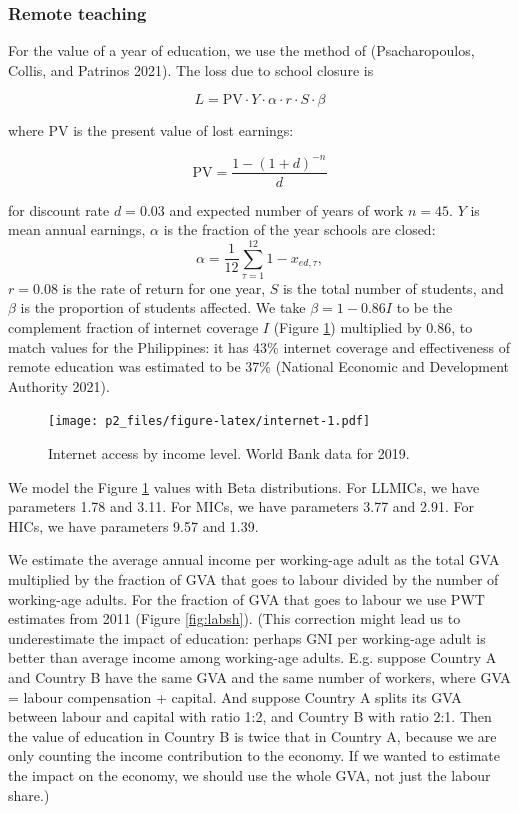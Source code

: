 \documentclass[
]{article}
\begin{document}
\hypertarget{remote-teaching}{%
\subsubsection{Remote teaching}\label{remote-teaching}}

For the value of a year of education, we use the method of (Psacharopoulos, Collis, and Patrinos 2021). The loss due to school closure is

\[L = \text{PV}\cdot Y\cdot \alpha\cdot r\cdot S\cdot \beta\]

where PV is the present value of lost earnings:

\[\text{PV} =  \frac{1-(1+d)^{-n}}{d}\]

for discount rate \(d=0.03\) and expected number of years of work \(n=45\). \(Y\) is mean annual earnings, \(\alpha\) is the fraction of the year schools are closed: \[\alpha=\frac{1}{12}\sum_{\tau=1}^{12}1-x_{ed,\tau},\] \(r=0.08\) is the rate of return for one year, \(S\) is the total number of students, and \(\beta\) is the proportion of students affected. We take \(\beta=1-0.86I\) to be the complement fraction of internet coverage \(I\) (Figure \ref{fig:internet}) multiplied by 0.86, to match values for the Philippines: it has 43\% internet coverage and effectiveness of remote education was estimated to be 37\% (National Economic and Development Authority 2021).

\begin{figure}
\centering
\texttt{[image: p2\_files/figure-latex/internet-1.pdf]}
\caption{\label{fig:internet}Internet access by income level. World Bank data for 2019.}
\end{figure}

We model the Figure \ref{fig:internet} values with Beta distributions. For LLMICs, we have parameters 1.78 and 3.11. For MICs, we have parameters 3.77 and 2.91. For HICs, we have parameters 9.57 and 1.39.

We estimate the average annual income per working-age adult as the total GVA multiplied by the fraction of GVA that goes to labour divided by the number of working-age adults. For the fraction of GVA that goes to labour we use PWT estimates from 2011 (Figure \ref{fig:labsh}). (This correction might lead us to underestimate the impact of education: perhaps GNI per working-age adult is better than average income among working-age adults. E.g. suppose Country A and Country B have the same GVA and the same number of workers, where GVA = labour compensation + capital. And suppose Country A splits its GVA between labour and capital with ratio 1:2, and Country B with ratio 2:1. Then the value of education in Country B is twice that in Country A, because we are only counting the income contribution to the economy. If we wanted to estimate the impact on the economy, we should use the whole GVA, not just the labour share.)
\end{document}
